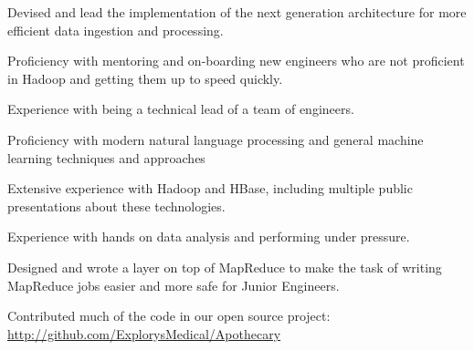 \documentclass[margin,line,12pt]{resume}
\begin{document}
\begin{resume}
    \begin{list2}
    \item  Devised and lead the implementation of the next generation architecture for more efficient data ingestion and processing.
    \item  Proficiency with mentoring and on-boarding new engineers who are not proficient in Hadoop and getting them up to speed quickly.
    \item  Experience with being a technical lead of a team of engineers.
    \item  Proficiency with modern natural language processing and general machine learning techniques and approaches
    \item  Extensive experience with Hadoop and HBase, including multiple public presentations about these technologies.
    \item  Experience with hands on data analysis and performing under pressure.
    \item  Designed and wrote a layer on top of MapReduce to make the task of writing MapReduce jobs easier and more safe for Junior Engineers.
    \item  Contributed much of the code in our open source project: \\\url{http://github.com/ExplorysMedical/Apothecary}
    \end{list2}

    \newpage
    \vspace*{1mm}




\end{resume}
\end{document}
